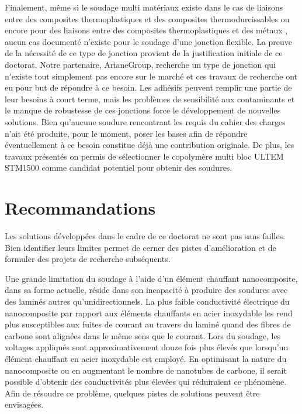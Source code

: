 Finalement, même si le soudage multi matériaux existe dans le cas de liaisons entre des composites thermoplastiques et des composites thermodurcissables \cite{FernandezVillegas2015,Lionetto2018a} ou encore pour des liaisons entre des composites thermoplastiques et des métaux \cite{Weidmann2018,Kruger2004,Balle2009,Goushegir2016}, aucun cas documenté n'existe pour le soudage d'une jonction flexible. 
La preuve de la nécessité de ce type de jonction provient de la justification initiale de ce doctorat.
Notre partenaire, ArianeGroup, recherche un type de jonction qui n'existe tout simplement pas encore sur le marché et ces travaux de recherche ont eu pour but de répondre à ce besoin. 
Les adhésifs peuvent remplir une partie de leur besoins à court terme, mais les problèmes de sensibilité aux contaminants et le manque de robustesse de ces jonctions force le développement de nouvelles solutions. 
Bien qu'aucune soudure rencontrant les requis du cahier des charges n'ait été produite, pour le moment, poser les bases afin de répondre éventuellement à ce besoin constitue déjà une contribution originale. 
De plus, les travaux présentés on permis de sélectionner le copolymère multi bloc ULTEM STM1500 comme candidat potentiel pour obtenir des soudures. 

\section{Recommandations}

Les solutions développées dans le cadre de ce doctorat ne sont pas sans failles. 
Bien identifier leurs limites permet de cerner des pistes d'amélioration et de formuler des projets de recherche subséquents. 

Une grande limitation du soudage à l'aide d'un élément chauffant nanocomposite, dans sa forme actuelle, réside dans son incapacité à produire des soudures avec des laminés autres qu'unidirectionnels. 
La plus faible conductivité électrique du nanocomposite par rapport aux éléments chauffants en acier inoxydable les rend plus susceptibles aux fuites de courant au travers du laminé quand des fibres de carbone sont alignées dans le même sens que le courant. 
Lors du soudage, les voltages appliqués sont approximativement douze fois plus élevés que lorsqu'un élément chauffant en acier inoxydable est employé. 
En optimisant la nature du nanocomposite ou en augmentant le nombre de nanotubes de carbone, il serait possible d'obtenir des conductivités plus élevées qui réduiraient ce phénomène. 
Afin de résoudre ce problème, quelques pistes de solutions peuvent être envisagées. 

